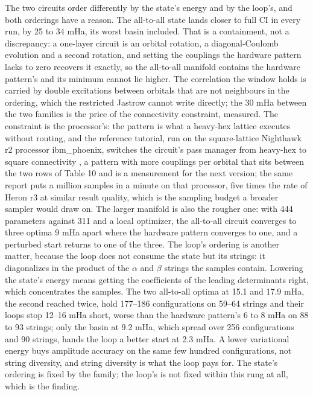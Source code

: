 \documentclass[11pt]{article}
\begin{document}
The two circuits order differently by the state's energy and by the loop's, and both orderings have a reason. The all-to-all state lands closer to full CI in every run, by 25 to 34 mHa, its worst basin included. That is a containment, not a discrepancy: a one-layer circuit is an orbital rotation, a diagonal-Coulomb evolution and a second rotation, and setting the couplings the hardware pattern lacks to zero recovers it exactly, so the all-to-all manifold contains the hardware pattern's and its minimum cannot lie higher. The correlation the window holds is carried by double excitations between orbitals that are not neighbours in the ordering, which the restricted Jastrow cannot write directly; the 30 mHa between the two families is the price of the connectivity constraint, measured. The constraint is the processor's: the pattern is what a heavy-hex lattice executes without routing, and the reference tutorial, run on the square-lattice Nighthawk r2 processor ibm\_phoenix, switches the circuit's pass manager from heavy-hex to square connectivity \cite{Huang2026}, a pattern with more couplings per orbital that sits between the two rows of Table 10 and is a measurement for the next version; the same report puts a million samples in a minute on that processor, five times the rate of Heron r3 at similar result quality, which is the sampling budget a broader sampler would draw on. The larger manifold is also the rougher one: with 444 parameters against 311 and a local optimizer, the all-to-all circuit converges to three optima 9 mHa apart where the hardware pattern converges to one, and a perturbed start returns to one of the three. The loop's ordering is another matter, because the loop does not consume the state but its strings: it diagonalizes in the product of the $\alpha$ and $\beta$ strings the samples contain. Lowering the state's energy means getting the coefficients of the leading determinants right, which concentrates the samples. The two all-to-all optima at 15.1 and 17.9 mHa, the second reached twice, hold 177--186 configurations on 59--64 strings and their loops stop 12--16 mHa short, worse than the hardware pattern's 6 to 8 mHa on 88 to 93 strings; only the basin at 9.2 mHa, which spread over 256 configurations and 90 strings, hands the loop a better start at 2.3 mHa. A lower variational energy buys amplitude accuracy on the same few hundred configurations, not string diversity, and string diversity is what the loop pays for. The state's ordering is fixed by the family; the loop's is not fixed within this rung at all, which is the finding.
\end{document}
